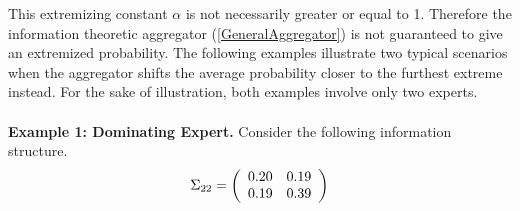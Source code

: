 \documentclass[11pt,twoside]{article}
\begin{document}
%
This extremizing constant $\alpha$ is not necessarily greater or equal to 1. Therefore the information theoretic aggregator (\ref{GeneralAggregator}) is not guaranteed to give an extremized probability. The following examples illustrate two typical scenarios when the aggregator shifts the average probability closer to the furthest extreme instead. For the sake of illustration, both examples involve only two experts. 
\\
\\
\textbf{Example 1: Dominating Expert.} Consider the following information structure. 
\begin{align*}
\Sigma_{22} =  \left(\begin{array}{c c}
0.20 & 0.19\\
0.19 & 0.39 \\
 \end{array}\right)
\end{align*}
\end{document}
